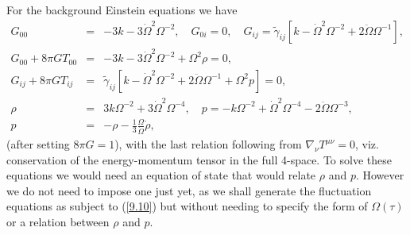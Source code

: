 For the background Einstein equations we have
%
\begin{eqnarray}
G_{00}&=& -3k - 3 \dot{\Omega}^2\Omega^{-2},\quad G_{0i} =0,
\quad G_{ij} = \tilde{\gamma}_{ij}\left[k - \dot\Omega^2\Omega^{-2}+ 2\ddot\Omega \Omega^{-1}\right],
\nonumber\\
G_{00}+8\pi G T_{00} &=& -3k - 3 \dot\Omega^2\Omega^{-2} + \Omega^2 \rho=0,
\nonumber\\
G_{ij}+8\pi G T_{ij}&=& \tilde{\gamma}_{ij}\left[k - \dot\Omega^2\Omega^{-2} + 2\ddot\Omega \Omega^{-1}  + \Omega^2 p\right]=0,
\nonumber\\
\rho &=& 3k\Omega^{-2}+3\dot\Omega^2 \Omega^{-4},\quad p = -k\Omega^{-2} + \dot\Omega^2\Omega^{-4} -2\ddot\Omega \Omega^{-3},
\nonumber\\
 p &=& -\rho -\frac{1}{3} \frac{\Omega}{\dot\Omega}\dot\rho,
\label{9.10}
\end{eqnarray}
%
(after setting $8\pi G=1$), with the last relation following from $\nabla_{\nu}T^{\mu\nu}=0$, viz. conservation of the energy-momentum tensor in the full 4-space. To solve these equations we would need an equation of state that would relate $\rho$ and $p$. However we do not need to impose one just yet, as we shall generate the fluctuation equations as subject to (\ref{9.10}) but without needing to specify the form of $\Omega(\tau)$ or a relation  between $\rho$ and $p$.

